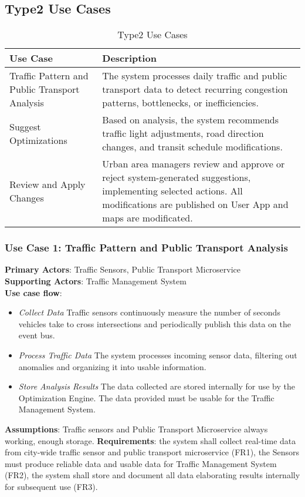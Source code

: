 \documentclass[a4paper,12pt]{article}
\begin{document}
\newpage

\subsection*{Type2 Use Cases}

\begin{table}[h!]
\centering
\begin{tabular}{|p{4.5cm}|p{8.5cm}|}
\hline
\textbf{Use Case} & \textbf{Description} \\
\hline
Traffic Pattern and Public Transport Analysis & The system processes daily traffic and public transport data to detect recurring congestion patterns, bottlenecks, or inefficiencies. \\
\hline
Suggest Optimizations & Based on analysis, the system recommends traffic light adjustments, road direction changes, and transit schedule modifications. \\
\hline
Review and Apply Changes & Urban area managers review and approve or reject system-generated suggestions, implementing selected actions. All modifications are published on User App and maps are modificated. \\
\hline
\end{tabular}
\caption{Type2 Use Cases}
\end{table}

\subsubsection*{Use Case 1: Traffic Pattern and Public Transport Analysis}
\textbf{Primary Actors}: Traffic Sensors, Public Transport Microservice \\
\textbf{Supporting Actors}: Traffic Management System \\ 
\textbf{Use case flow}: 
\begin{itemize}
    \item \textit{Collect Data} Traffic sensors continuously measure the number of seconds vehicles take to cross intersections and periodically publish this data on the event bus.
    \item \textit{Process Traffic Data} The system processes incoming sensor data, filtering out anomalies and organizing it into usable information.
    \item \textit{Store Analysis Results} The data collected are stored internally for use by the Optimization Engine. The data provided must be usable for the Traffic Management System.
\end{itemize}
\textbf{Assumptions}: Traffic sensors and Public Transport Microservice always working, enough storage.
\textbf{Requirements}: the system shall collect real-time data from city-wide traffic sensor and public transport microservice (FR1), the Sensors must produce reliable data and usable data for Traffic Management System (FR2), the system shall store and document all data elaborating results internally for subsequent use (FR3).
\end{document}

